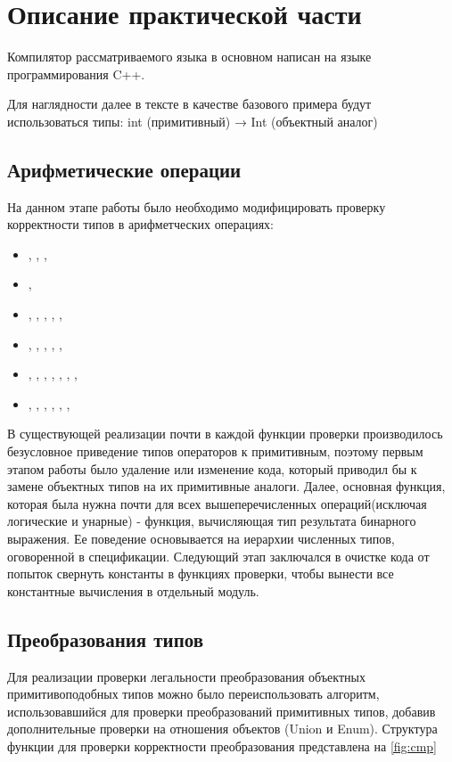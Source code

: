 \section{Описание практической части}
\label{sec:Chapter4} 

Компилятор рассматриваемого языка в основном написан на языке программирования C++.

Для наглядности далее в тексте в качестве базового примера будут использоваться типы:
int (примитивный) → Int (объектный аналог)

\subsection{Арифметические операции}
На данном этапе работы было необходимо модифицировать проверку корректности типов в арифметческих операциях:
\begin{itemize}[label={}]
    \item \code{+} , \code{-} , \code{+=} , \code{-=}
    \item \code{++} , \code{--}
    \item \code{*} , \code{/} , \code{\%} , \code{*=}, \code{/=}, \code{\%=}
    \item \code{$\langle \langle$} , \code{$\rangle \rangle$} , \code{$\langle \langle$=} , \code{$\rangle \rangle$=}, \code{$\rangle \rangle \rangle$}, \code{$\rangle \rangle \rangle$=}
    \item \code{|} , \code{|=} , \code{\&} , \code{\&=}, \code{\^}, \code{\^}\code{=}, \code{||} , \code{\&\&}
    \item \code{<} , \code{<=} , \code{>}, \code{>=}, \code{==}, \code{===}, \code{!}
\end{itemize}

В существующей реализации почти в каждой функции проверки производилось безусловное приведение типов операторов к примитивным, поэтому первым этапом работы было удаление или изменение кода, который приводил бы к замене объектных типов на их примитивные аналоги. Далее, основная функция, которая была нужна почти для всех вышеперечисленных операций(исключая логические и унарные) - функция, вычисляющая тип результата бинарного выражения. Ее поведение основывается на иерархии численных типов, оговоренной в спецификации.
Следующий этап заключался в очистке кода от попыток свернуть константы в функциях проверки, чтобы вынести все константные вычисления в отдельный модуль.

\subsection{Преобразования типов}
Для реализации проверки легальности преобразования объектных примитивоподобных типов можно было переиспользовать алгоритм, использовавшийся для проверки преобразований примитивных типов, добавив дополнительные проверки на отношения объектов (Union и Enum).
Структура функции для проверки корректности преобразования представлена на \ref{fig:cmp}
